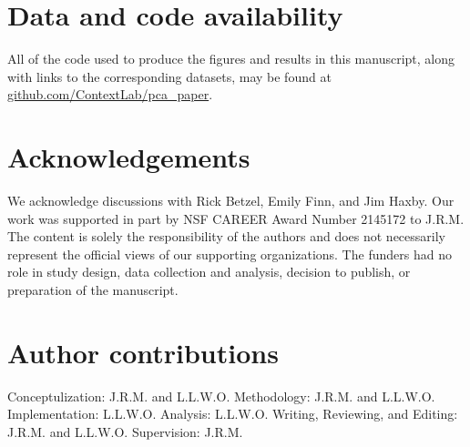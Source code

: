 \documentclass[english, 11pt]{article}
\begin{document}
\section*{Data and code availability}

All of the code used to produce the figures and results in this manuscript,
along with links to the corresponding datasets, may be found at 
\href{https://github.com/ContextLab/pca_paper}{github.com/ContextLab/pca\_paper}.

\section*{Acknowledgements} 

We acknowledge discussions with Rick Betzel, Emily Finn, and Jim Haxby. Our
work was supported in part by NSF CAREER Award Number 2145172 to J.R.M. The
content is solely the responsibility of the authors and does not necessarily
represent the official views of our supporting organizations. The funders had
no role in study design, data collection and analysis, decision to publish, or
preparation of the manuscript.


\section*{Author contributions} 

Conceptulization: J.R.M. and L.L.W.O. Methodology: J.R.M. and L.L.W.O.
Implementation: L.L.W.O. Analysis: L.L.W.O. Writing, Reviewing, and Editing:
J.R.M. and L.L.W.O. Supervision: J.R.M.



\end{document}
